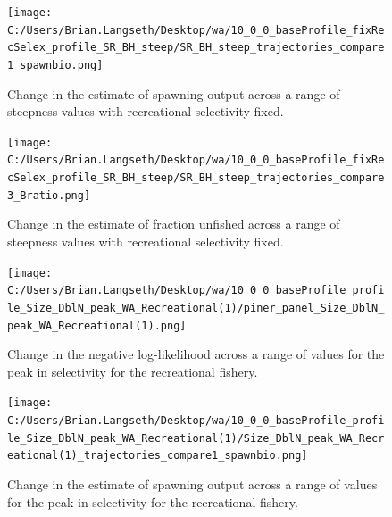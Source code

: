 \documentclass[11pt,
  english,
  letterpaper,
]{article}
\begin{document}
\tagmcend\tagstructend


\begin{figure}
\centering
\texttt{[image: C:/Users/Brian.Langseth/Desktop/wa/10\_0\_0\_baseProfile\_fixRecSelex\_profile\_SR\_BH\_steep/SR\_BH\_steep\_trajectories\_compare1\_spawnbio.png]}
\caption{Change in the estimate of spawning output across a range of steepness values with recreational selectivity fixed.\label{fig:h-recfix-ssb}}
\end{figure}

\tagmcend\tagstructend


\begin{figure}
\centering
\texttt{[image: C:/Users/Brian.Langseth/Desktop/wa/10\_0\_0\_baseProfile\_fixRecSelex\_profile\_SR\_BH\_steep/SR\_BH\_steep\_trajectories\_compare3\_Bratio.png]}
\caption{Change in the estimate of fraction unfished across a range of steepness values with recreational selectivity fixed.\label{fig:h-recfix-depl}}
\end{figure}

\tagmcend\tagstructend


\begin{figure}
\centering
\texttt{[image: C:/Users/Brian.Langseth/Desktop/wa/10\_0\_0\_baseProfile\_profile\_Size\_DblN\_peak\_WA\_Recreational(1)/piner\_panel\_Size\_DblN\_peak\_WA\_Recreational(1).png]}
\caption{Change in the negative log-likelihood across a range of values for the peak in selectivity for the recreational fishery.\label{fig:recselex-profile}}
\end{figure}

\tagmcend\tagstructend


\begin{figure}
\centering
\texttt{[image: C:/Users/Brian.Langseth/Desktop/wa/10\_0\_0\_baseProfile\_profile\_Size\_DblN\_peak\_WA\_Recreational(1)/Size\_DblN\_peak\_WA\_Recreational(1)\_trajectories\_compare1\_spawnbio.png]}
\caption{Change in the estimate of spawning output across a range of values for the peak in selectivity for the recreational fishery.\label{fig:recselex-ssb}}
\end{figure}
\end{document}
